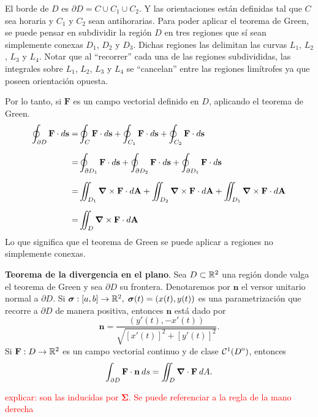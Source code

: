 \begin{obs}
    El borde de $D$ es $\partial D=C\cup C_1\cup C_2$. Y las orientaciones est\'an definidas tal que $C$ sea horaria y $C_1$ y $C_2$ sean antihorarias. Para poder aplicar el teorema de Green, se puede pensar en subdividir la regi\'on $D$ en tres regiones que s\'i sean simplemente conexas $D_1$, $D_2$ y $D_3$. Dichas regiones las delimitan las curvas $L_1$, $L_2$, $L_3$ y $L_4$. Notar que al ``recorrer'' cada una de las regiones subdivididas, las integrales sobre $L_1$, $L_2$, $L_3$ y $L_4$ se ``cancelan'' entre las regiones lim\'itrofes ya que poseen orientación opuesta. 
    
    Por lo tanto, si $\mathbf{F}$ es un campo vectorial definido en $D$, aplicando el teorema de Green.
    \begin{align*}
        \oint_{\partial D} \mathbf{F}\cdot d\mathbf{s}=&\oint_{C}\mathbf{F}\cdot d\mathbf{s}+\oint_{C_1}\mathbf{F}\cdot d\mathbf{s}+\oint_{C_2}\mathbf{F}\cdot d\mathbf{s}\\[.2cm]
        =&\oint_{\partial D_1}\mathbf{F}\cdot d\mathbf{s}+\oint_{\partial D_2}\mathbf{F}\cdot d\mathbf{s}+\oint_{\partial D_1}\mathbf{F}\cdot d\mathbf{s}\\[.2cm]
        =&\iint_{ D_1}\grad\times\mathbf{F}\cdot d\mathbf{A}+\iint_{ D_2}\grad\times\mathbf{F}\cdot d\mathbf{A}+\iint_{ D_1}\grad\times\mathbf{F}\cdot d\mathbf{A}\\[.2cm]
        =&\iint_D \grad\times\mathbf{F}\cdot d\mathbf{A}
    \end{align*}
    Lo que significa que el teorema de Green se puede aplicar a regiones no simplemente conexas.
\end{obs}

\begin{theorem}
\textbf{Teorema de la divergencia en el plano}. Sea $D\subset\mathbb{R}^2$ una regi\'on donde valga el teorema de Green y sea $\partial D$ su frontera. Denotaremos por $\mathbf{n}$ el versor unitario normal a $\partial D$.  Si $\boldsymbol{\sigma}:[a,b]\to\mathbb{R}^2,\;\boldsymbol{\sigma}(t)=(x(t),y(t))$ es una parametrizaci\'on que recorre a $\partial D$ de manera positiva,  entonces  $\mathbf{n}$ est\'a dado por 
\[
    \mathbf{n}=\frac{(y'(t),-x'(t))}{\sqrt{[x'(t)]^2+[y'(t)]^2}}.
\]
Si $\mathbf{F}:  D\to \mathbb{R}^2$ es un campo vectorial continuo y de clase $\mathcal{C}^1({\kern0ptD}^{\mathrm{o}})$,  entonces
\[
    \int_{\partial D}\mathbf{F}\cdot\mathbf{n}\:ds=\iint_D\grad\cdot\mathbf{F}\:dA.
\]
\end{theorem}


\textcolor{red}{explicar:  son las inducidas por $\boldsymbol{\Sigma}$. Se puede referenciar a la regla de la mano derecha}

